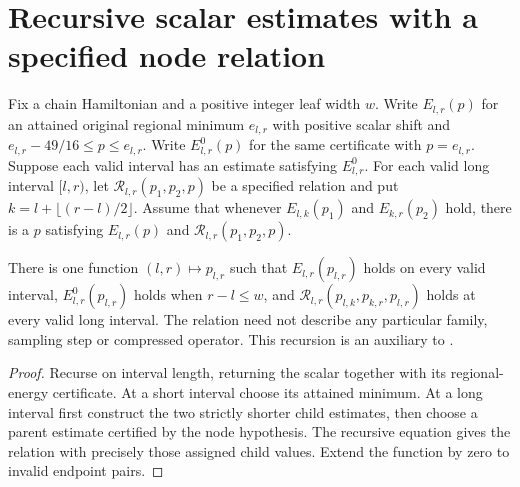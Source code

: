 \section{Recursive scalar estimates with a specified node relation}

\begin{lemma}
    \label{thm:regional_energy_node_relation_assignment}
    \leanok
    Fix a chain Hamiltonian and a positive integer leaf width $w$.
    Write $E_{l,r}(p)$ for an attained original regional minimum $e_{l,r}$
    with positive scalar shift and $e_{l,r}-49/16\le p\le e_{l,r}$.
    Write $E^0_{l,r}(p)$ for the same certificate with $p=e_{l,r}$.
    Suppose each valid interval has an estimate satisfying $E^0_{l,r}$.
    For each valid long interval $[l,r)$, let
    $\mathcal R_{l,r}(p_1,p_2,p)$ be a specified relation and put
    $k=l+\lfloor(r-l)/2\rfloor$. Assume that whenever
    $E_{l,k}(p_1)$ and $E_{k,r}(p_2)$ hold, there is a $p$ satisfying
    $E_{l,r}(p)$ and $\mathcal R_{l,r}(p_1,p_2,p)$.

    There is one function $(l,r)\mapsto p_{l,r}$ such that $E_{l,r}(p_{l,r})$
    holds on every valid interval, $E^0_{l,r}(p_{l,r})$ holds when $r-l\le w$,
    and $\mathcal R_{l,r}(p_{l,k},p_{k,r},p_{l,r})$ holds at every valid
    long interval. The relation need not describe any particular family,
    sampling step or compressed operator. This recursion is an auxiliary to
    \cite[Figure~\texttt{fig:algo1}, line 1631]{Arad2016RigorousRG}.
\end{lemma}
\begin{proof}\leanok
    Recurse on interval length, returning the scalar together with its
    regional-energy certificate. At a short interval choose its attained
    minimum. At a long interval first construct the two strictly shorter
    child estimates, then choose a parent estimate certified by the node
    hypothesis. The recursive equation gives the relation with precisely
    those assigned child values. Extend the function by zero to invalid
    endpoint pairs.
\end{proof}

